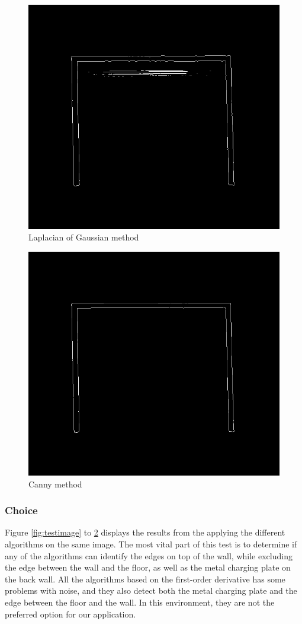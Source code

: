 \begin{figure}[H]
  \centering
  \includegraphics[width=.7\linewidth]{fig/LoG}
  \caption{Laplacian of Gaussian method}
  \label{fig:logtest}
\end{figure}
\begin{figure}[H]
  \centering
  \includegraphics[width=.7\linewidth]{fig/Canny}
  \caption{Canny method}
  \label{fig:cannytest}
\end{figure}
\subsubsection{Choice}
Figure \ref{fig:testimage} to \ref{fig:cannytest} displays the results from the applying the different algorithms on the same image. The most vital part of this test is to determine if any of the algorithms can identify the edges on top of the wall, while excluding the edge between the wall and the floor, as well as the metal charging plate on the back wall. All the algorithms based on the first-order derivative has some problems with noise, and they also detect both the metal charging plate and the edge between the floor and the wall. In this environment, they are not the preferred option for our application.\\

